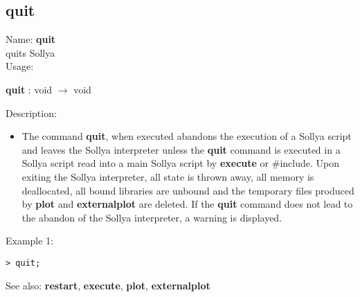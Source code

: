 \subsection{ quit }
\noindent Name: \textbf{quit}\\
quits Sollya\\

\noindent Usage: 
\begin{center}
\textbf{quit} : \textsf{void} $\rightarrow$ \textsf{void}\\
\end{center}
\noindent Description: \begin{itemize}

\item The command \textbf{quit}, when executed abandons the execution of a Sollya
   script and leaves the Sollya interpreter unless the \textbf{quit} command 
   is executed in a Sollya script read into a main Sollya script by
   \textbf{execute} or $\#$include.
   Upon exiting the Sollya interpreter, all state is thrown away, all
   memory is deallocated, all bound libraries are unbound and the
   temporary files produced by \textbf{plot} and \textbf{externalplot} are deleted.
   If the \textbf{quit} command does not lead to the abandon of the Sollya
   interpreter, a warning is displayed.
\end{itemize}
\noindent Example 1: 
\begin{center}\begin{minipage}{14.8cm}\begin{Verbatim}[frame=single]
   > quit;
\end{Verbatim}
\end{minipage}\end{center}
See also: \textbf{restart}, \textbf{execute}, \textbf{plot}, \textbf{externalplot}
